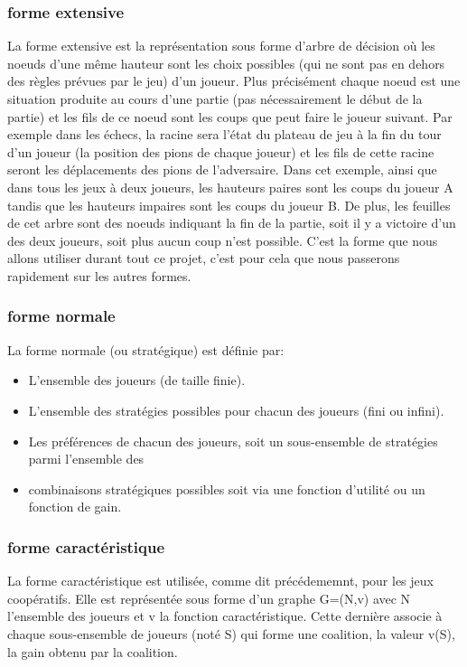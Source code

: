\documentclass[a4paper, 12pt, french]{article}
\begin{document}
	\subsubsection{forme extensive}
	La forme extensive est la représentation sous forme d'arbre de décision où les noeuds d'une même hauteur sont les
	choix possibles (qui ne sont pas en dehors des règles prévues par le jeu) d'un joueur. Plus précisément chaque
	noeud est une situation produite au cours d'une partie (pas nécessairement le début de la partie) et les fils de
	ce noeud sont les coups que peut faire le joueur suivant. Par exemple dans les échecs, la racine sera l'état du
	plateau de jeu à la fin du tour d'un joueur (la position des pions de chaque joueur) et les fils de cette racine
	seront les déplacements des pions de l'adversaire. Dans cet exemple, ainsi que dans tous les jeux à deux joueurs,
	les hauteurs paires sont les coups du joueur A tandis que les hauteurs impaires sont les coups du joueur B.
	De plus, les feuilles de cet arbre sont des noeuds indiquant la fin de la partie, soit il y a victoire d'un des
	deux joueurs, soit plus aucun coup n'est possible.
	C'est la forme que nous allons utiliser durant tout ce projet, c'est pour cela que nous passerons rapidement sur
	les autres formes.

	\subsubsection{forme normale}
	La forme normale (ou stratégique) est définie par:
	\begin{itemize}
		\item L'ensemble des joueurs (de taille finie).
		\item L'ensemble des stratégies possibles pour chacun des joueurs (fini ou infini).
		\item Les préférences de chacun des joueurs, soit un sous-ensemble de stratégies parmi l'ensemble des
		\item combinaisons stratégiques possibles soit via une fonction d'utilité ou un fonction de gain.
	\end{itemize}

	\subsubsection{forme caractéristique}
	La forme caractéristique est utilisée, comme dit précédememnt, pour les jeux coopératifs. Elle est représentée
	sous forme d'un graphe G=(N,v) avec N l'ensemble des joueurs et v la fonction caractéristique. Cette dernière
	associe à chaque sous-ensemble de joueurs (noté S) qui forme une coalition, la valeur v(S), la gain obtenu
	par la coalition.
\end{document}
